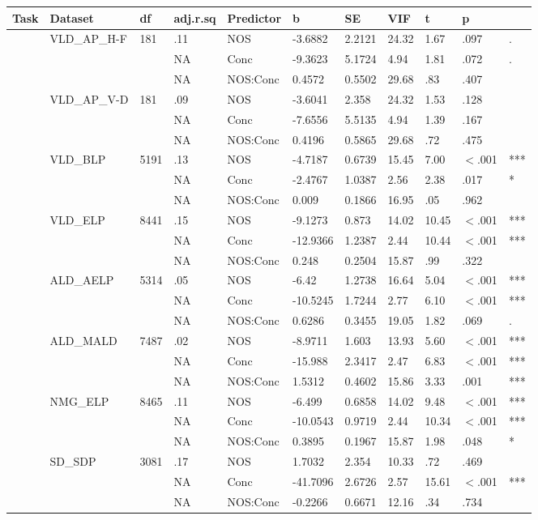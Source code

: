 \begin{table}[ht]
\centering
\begingroup\normalsize
\begin{tabular}{lllllllllll}
  \hline
Task & Dataset & df & adj.r.sq & Predictor & b & SE & VIF & t & p &  \\ 
  \hline
 & VLD\_AP\_H-F & 181 & .11 & NOS & -3.6882 & 2.2121 & 24.32 & 1.67 & .097 & . \\ 
   &  &  & NA & Conc & -9.3623 & 5.1724 & 4.94 & 1.81 & .072 & . \\ 
   &  &  & NA & NOS:Conc & 0.4572 & 0.5502 & 29.68 & .83 & .407 &   \\ 
   & VLD\_AP\_V-D & 181 & .09 & NOS & -3.6041 & 2.358 & 24.32 & 1.53 & .128 &   \\ 
   &  &  & NA & Conc & -7.6556 & 5.5135 & 4.94 & 1.39 & .167 &   \\ 
   &  &  & NA & NOS:Conc & 0.4196 & 0.5865 & 29.68 & .72 & .475 &   \\ 
   & VLD\_BLP & 5191 & .13 & NOS & -4.7187 & 0.6739 & 15.45 & 7.00 & $<$.001 & *** \\ 
   &  &  & NA & Conc & -2.4767 & 1.0387 & 2.56 & 2.38 & .017 & * \\ 
   &  &  & NA & NOS:Conc & 0.009 & 0.1866 & 16.95 & .05 & .962 &   \\ 
   & VLD\_ELP & 8441 & .15 & NOS & -9.1273 & 0.873 & 14.02 & 10.45 & $<$.001 & *** \\ 
   &  &  & NA & Conc & -12.9366 & 1.2387 & 2.44 & 10.44 & $<$.001 & *** \\ 
   &  &  & NA & NOS:Conc & 0.248 & 0.2504 & 15.87 & .99 & .322 &   \\ 
   & ALD\_AELP & 5314 & .05 & NOS & -6.42 & 1.2738 & 16.64 & 5.04 & $<$.001 & *** \\ 
   &  &  & NA & Conc & -10.5245 & 1.7244 & 2.77 & 6.10 & $<$.001 & *** \\ 
   &  &  & NA & NOS:Conc & 0.6286 & 0.3455 & 19.05 & 1.82 & .069 & . \\ 
   & ALD\_MALD & 7487 & .02 & NOS & -8.9711 & 1.603 & 13.93 & 5.60 & $<$.001 & *** \\ 
   &  &  & NA & Conc & -15.988 & 2.3417 & 2.47 & 6.83 & $<$.001 & *** \\ 
   &  &  & NA & NOS:Conc & 1.5312 & 0.4602 & 15.86 & 3.33 & .001 & *** \\ 
   & NMG\_ELP & 8465 & .11 & NOS & -6.499 & 0.6858 & 14.02 & 9.48 & $<$.001 & *** \\ 
   &  &  & NA & Conc & -10.0543 & 0.9719 & 2.44 & 10.34 & $<$.001 & *** \\ 
   &  &  & NA & NOS:Conc & 0.3895 & 0.1967 & 15.87 & 1.98 & .048 & * \\ 
   & SD\_SDP & 3081 & .17 & NOS & 1.7032 & 2.354 & 10.33 & .72 & .469 &   \\ 
   &  &  & NA & Conc & -41.7096 & 2.6726 & 2.57 & 15.61 & $<$.001 & *** \\ 
   &  &  & NA & NOS:Conc & -0.2266 & 0.6671 & 12.16 & .34 & .734 &   \\ 
   \hline
\end{tabular}
\endgroup
\end{table}

